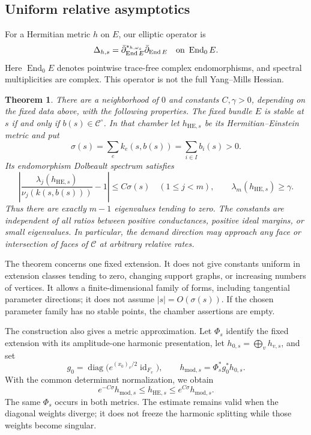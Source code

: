 \documentclass[11pt]{amsart}
\newtheorem{theorem}{Theorem}[section]
\theoremstyle{definition}
\theoremstyle{remark}
\newcommand{\db}{\bar\partial}
\newcommand{\End}{\operatorname{End}}
\newcommand{\diag}{\operatorname{diag}}
\newcommand{\id}{\operatorname{id}}
\newcommand{\cC}{\mathcal C}
\begin{document}
\subsection{Uniform relative asymptotics}

For a Hermitian metric \(h\) on \(E\), our elliptic operator is
\[
 \Delta_{h,s}=\db_{\End E}^{*_{h,\omega_s}}\db_{\End E}
 \quad\hbox{on }\End_0E.
\]
Here \(\End_0E\) denotes pointwise trace-free complex endomorphisms,
and spectral multiplicities are complex. This operator is not the
full Yang--Mills Hessian.

\begin{theorem}\label{thm01:main}
There are a neighborhood of \(0\) and constants \(C,\gamma>0\),
depending on the fixed data above, with the following properties.
The fixed bundle \(E\) is stable at \(s\) if and only if
\(b(s)\in\cC^\circ\).
In that chamber let \(h_{\mathrm{HE},s}\) be its
Hermitian--Einstein metric and put
\begin{equation}\label{eq01:sigma}
 \sigma(s)=\sum_e k_e(s,b(s))
          =\sum_{i\in I}b_i(s)>0.
\end{equation}
Its endomorphism Dolbeault spectrum satisfies
\begin{equation}\label{eq01:mainestimate}
 \left|\frac{\lambda_j(h_{\mathrm{HE},s})}
                 {\nu_j(k(s,b(s)))}-1\right|
 \leq C\sigma(s)\quad(1\leq j<m),\qquad
 \lambda_m(h_{\mathrm{HE},s})\geq\gamma.
\end{equation}
Thus there are exactly \(m-1\) eigenvalues tending to zero.
The constants are independent of all ratios between positive
conductances, positive ideal margins, or small eigenvalues.
In particular, the demand
direction may approach any face or intersection of faces of
\(\cC\) at arbitrary relative rates.
\end{theorem}

The theorem concerns one fixed extension. It does not give constants
uniform in extension classes tending to zero, changing support
graphs, or increasing numbers of vertices. It allows a
finite-dimensional family of forms, including tangential parameter
directions; it does not assume \(|s|=O(\sigma(s))\).
If the chosen parameter family has no stable points, the chamber
assertions are empty.

The construction also gives a metric approximation. Let \(\Phi_s\)
identify the fixed extension with its amplitude-one harmonic
presentation, let \(h_{0,s}=\bigoplus_vh_{v,s}\), and set
\[
 g_0=\diag\bigl(e^{(x_0)_v/2}\id_{F_v}\bigr),\qquad
 h_{\mathrm{mod},s}=\Phi_s^*g_0^*h_{0,s}.
\]
With the common determinant normalization, we obtain
\begin{equation}\label{eq01:metric}
 e^{-C\sigma}h_{\mathrm{mod},s}
 \leq h_{\mathrm{HE},s}
 \leq e^{C\sigma}h_{\mathrm{mod},s}.
\end{equation}
The same \(\Phi_s\) occurs in both metrics. The estimate remains
valid when the diagonal weights diverge; it does not freeze the
harmonic splitting while those weights become singular.
\end{document}
